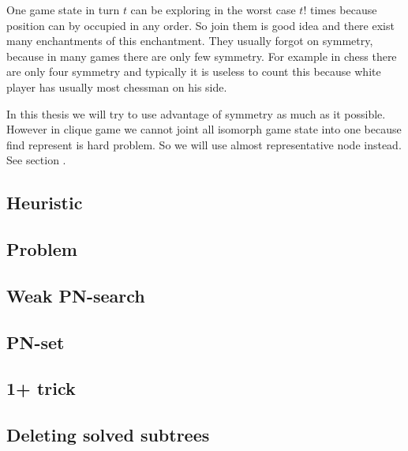 One game state in turn $t$ can be exploring in the worst case $t!$ times
because position can by occupied in any order. So join them is good idea and
there exist many enchantments of this enchantment. They usually forgot on
symmetry, because in many games there are only few symmetry. For example in
chess there are only four symmetry and typically it is useless to count this
because white player has usually most chessman on his side. 

In this thesis we will try to use advantage of symmetry as much as it possible. However in clique
game we cannot joint all isomorph game state into one because find represent is hard problem.
So we will use almost representative node instead. See section .

\subsection{Heuristic}

\subsection{Problem  }

\subsection{Weak PN-search}

\subsection{PN-set}

\subsection{1+ trick}


\subsection{Deleting solved subtrees}


